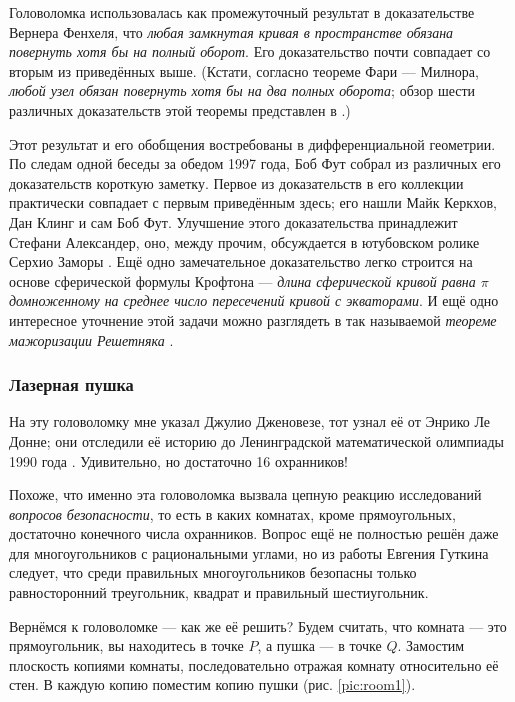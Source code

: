 \begin{addedbytheeditors}
Головоломка использовалась как промежуточный результат \cite[Satz I$'$]{fenchel}
в доказательстве Вернера Фенхеля, что \emph{любая замкнутая кривая в пространстве обязана повернуть хотя бы на полный оборот}.
Его доказательство почти совпадает со вторым из приведённых выше.
(Кстати, согласно теореме Фари --- Милнора, \emph{любой узел обязан повернуть хотя бы на два полных оборота}; обзор шести различных доказательств этой теоремы представлен в \cite{petrunin-stadler}.)

Этот результат и его обобщения востребованы в дифференциальной геометрии.
По следам одной беседы за обедом 1997 года, Боб Фут собрал из различных его доказательств короткую заметку.
Первое из доказательств в его коллекции практически совпадает с первым приведённым здесь;
его нашли Майк Керкхов, Дан Клинг и сам Боб Фут.
Улучшение этого доказательства принадлежит Стефани Александер, оно, между прочим, обсуждается в ютубовском ролике Серхио Заморы \cite{zamora}.
Ещё одно замечательное доказательство легко строится на основе сферической формулы Крофтона --- \emph{длина сферической кривой равна $\pi$ домноженному на среднее число пересечений кривой с экваторами}.
И ещё одно интересное уточнение этой задачи можно разглядеть в так называемой \emph{теореме мажоризации Решетняка} \cite{reshetnyak}.\pr
\end{addedbytheeditors}

\subsubsection*{Лазерная пушка}

На эту головоломку мне указал Джулио Дженовезе, тот узнал её от Энрико Ле Донне; они отследили её историю до Ленинградской математической олимпиады 1990 года \cite{17}.
Удивительно, но достаточно 16 охранников!

Похоже, что именно эта головоломка вызвала цепную реакцию исследований \emph{вопросов безопасности}, то есть в каких комнатах, кроме прямоугольных, достаточно конечного числа охранников.
Вопрос ещё не полностью решён даже для многоугольников с рациональными углами, но из работы Евгения Гуткина \cite{34} следует, что среди правильных многоугольников безопасны только равносторонний треугольник, квадрат и правильный шестиугольник.

Вернёмся к головоломке --- как же её решить?
Будем считать, что комната --- это прямоугольник, вы находитесь в точке $P$, а пушка --- в точке $Q$.
Замостим плоскость копиями комнаты, последовательно отражая комнату относительно её стен.
В каждую копию поместим копию пушки (рис. \ref{pic:room1}).

